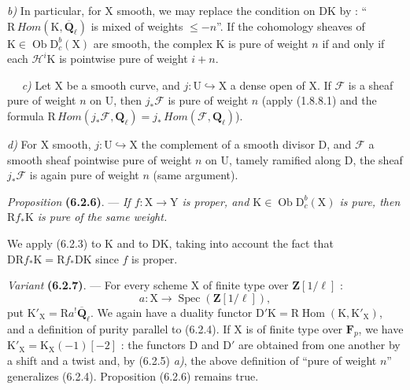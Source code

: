 \documentclass[11pt,leqno]{article}
\newcommand{\Page}[1]{\ifvmode\noindent\else\unskip\ \fi{\footnotesize\textcolor{gray}{[p.\,#1]}}\ \ignorespaces}
\begin{document}
\textit{b)} In particular, for \(\mathrm{X}\) smooth, we may
replace the condition on \(\mathrm{D}\mathrm{K}\) by :
“\(\mathrm{R}\,\mathit{Hom}(\mathrm{K},\overline{\mathbf{Q}}_\ell)\)
is mixed of weights \(\leq-n\)”. If the cohomology sheaves of
\(\mathrm{K}\in\operatorname{Ob}\mathrm{D}_c^b(\mathrm{X})\) are
smooth, the complex \(\mathrm{K}\) is pure of weight \(n\) if and
only if each \(\mathscr{H}^i\mathrm{K}\) is pointwise
pure of weight \(i+n\).

\Page{248}
\textit{c)} Let \(\mathrm{X}\) be a smooth curve, and
\(j:\mathrm{U}\hookrightarrow\mathrm{X}\) a dense open of
\(\mathrm{X}\). If \(\mathscr{F}\) is a sheaf pure of weight
\(n\) on \(\mathrm{U}\), then \(j_*\mathscr{F}\) is pure of weight
\(n\) (apply (1.8.8.1) and the formula
\(\mathrm{R}\,\mathit{Hom}(j_*\mathscr{F},\mathbf{Q}_\ell)
=j_*\,\mathit{Hom}(\mathscr{F},\mathbf{Q}_\ell)\)).

\textit{d)} For \(\mathrm{X}\) smooth,
\(j:\mathrm{U}\hookrightarrow\mathrm{X}\) the complement of a
smooth divisor \(\mathrm{D}\), and \(\mathscr{F}\) a smooth sheaf
pointwise pure of weight \(n\) on \(\mathrm{U}\), tamely
ramified along \(\mathrm{D}\), the sheaf \(j_*\mathscr{F}\)
is again pure of weight \(n\) (same argument).

\textit{Proposition} \textbf{(6.2.6)}. — \textit{If
\(f:\mathrm{X}\to\mathrm{Y}\) is proper, and
\(\mathrm{K}\in\operatorname{Ob}\mathrm{D}_c^b(\mathrm{X})\) is
pure, then \(\mathrm{R}f_*\mathrm{K}\) is pure of the same weight.}

We apply (6.2.3) to \(\mathrm{K}\) and to \(\mathrm{D}\mathrm{K}\),
taking into account the fact that
\(\mathrm{D}\mathrm{R}f_*\mathrm{K}
=\mathrm{R}f_*\mathrm{D}\mathrm{K}\) since \(f\) is proper.

\textit{Variant} \textbf{(6.2.7)}. — For every scheme \(\mathrm{X}\)
of finite type over \(\mathbf{Z}[1/\ell]\) :
\[
a:\mathrm{X}\to\operatorname{Spec}(\mathbf{Z}[1/\ell]),
\]
put \(\mathrm{K}'_{\mathrm{X}}=\mathrm{R}a^!\overline{\mathbf{Q}}_\ell\).
We again have a duality functor
\(\mathrm{D}'\mathrm{K}
=\mathrm{R}\operatorname{Hom}(\mathrm{K},\mathrm{K}'_{\mathrm{X}})\),
and a definition of purity parallel to (6.2.4). If
\(\mathrm{X}\) is of finite type over \(\mathbf{F}_p\), we have
\(\mathrm{K}'_{\mathrm{X}}=\mathrm{K}_{\mathrm{X}}(-1)[-2]\) :
the functors \(\mathrm{D}\) and \(\mathrm{D}'\) are obtained from one
another by a shift and a twist and, by (6.2.5) \textit{a)},
the above definition of “pure of weight \(n\)” generalizes
(6.2.4). Proposition (6.2.6) remains true.
\end{document}
